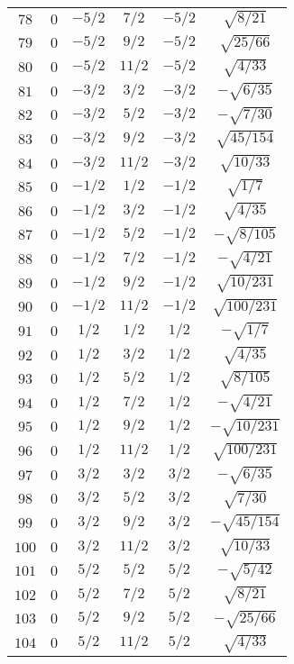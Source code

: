 \begin{table}
\begin{center}
\begin{tabular}{|c|c|c|c|c|c|}
$78$ & $0$ & $-5/2$ & $7/2$ & $-5/2$ & $\sqrt{8/21}$ \\ 
$79$ & $0$ & $-5/2$ & $9/2$ & $-5/2$ & $\sqrt{25/66}$ \\ 
$80$ & $0$ & $-5/2$ & $11/2$ & $-5/2$ & $\sqrt{4/33}$ \\ 
$81$ & $0$ & $-3/2$ & $3/2$ & $-3/2$ & $-\sqrt{6/35}$ \\ 
$82$ & $0$ & $-3/2$ & $5/2$ & $-3/2$ & $-\sqrt{7/30}$ \\ 
$83$ & $0$ & $-3/2$ & $9/2$ & $-3/2$ & $\sqrt{45/154}$ \\ 
$84$ & $0$ & $-3/2$ & $11/2$ & $-3/2$ & $\sqrt{10/33}$ \\ 
$85$ & $0$ & $-1/2$ & $1/2$ & $-1/2$ & $\sqrt{1/7}$ \\ 
$86$ & $0$ & $-1/2$ & $3/2$ & $-1/2$ & $\sqrt{4/35}$ \\ 
$87$ & $0$ & $-1/2$ & $5/2$ & $-1/2$ & $-\sqrt{8/105}$ \\ 
$88$ & $0$ & $-1/2$ & $7/2$ & $-1/2$ & $-\sqrt{4/21}$ \\ 
$89$ & $0$ & $-1/2$ & $9/2$ & $-1/2$ & $\sqrt{10/231}$ \\ 
$90$ & $0$ & $-1/2$ & $11/2$ & $-1/2$ & $\sqrt{100/231}$ \\ 
$91$ & $0$ & $1/2$ & $1/2$ & $1/2$ & $-\sqrt{1/7}$ \\ 
$92$ & $0$ & $1/2$ & $3/2$ & $1/2$ & $\sqrt{4/35}$ \\ 
$93$ & $0$ & $1/2$ & $5/2$ & $1/2$ & $\sqrt{8/105}$ \\ 
$94$ & $0$ & $1/2$ & $7/2$ & $1/2$ & $-\sqrt{4/21}$ \\ 
$95$ & $0$ & $1/2$ & $9/2$ & $1/2$ & $-\sqrt{10/231}$ \\ 
$96$ & $0$ & $1/2$ & $11/2$ & $1/2$ & $\sqrt{100/231}$ \\ 
$97$ & $0$ & $3/2$ & $3/2$ & $3/2$ & $-\sqrt{6/35}$ \\ 
$98$ & $0$ & $3/2$ & $5/2$ & $3/2$ & $\sqrt{7/30}$ \\ 
$99$ & $0$ & $3/2$ & $9/2$ & $3/2$ & $-\sqrt{45/154}$ \\ 
$100$ & $0$ & $3/2$ & $11/2$ & $3/2$ & $\sqrt{10/33}$ \\ 
$101$ & $0$ & $5/2$ & $5/2$ & $5/2$ & $-\sqrt{5/42}$ \\ 
$102$ & $0$ & $5/2$ & $7/2$ & $5/2$ & $\sqrt{8/21}$ \\ 
$103$ & $0$ & $5/2$ & $9/2$ & $5/2$ & $-\sqrt{25/66}$ \\ 
$104$ & $0$ & $5/2$ & $11/2$ & $5/2$ & $\sqrt{4/33}$ \\ 

\end{tabular}
\end{center}
\end{table}
